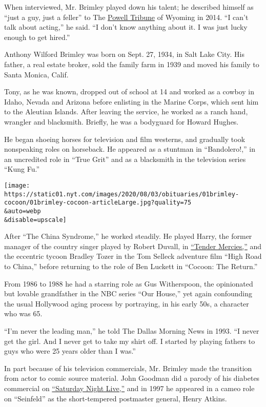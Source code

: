 When interviewed, Mr. Brimley played down his talent; he described
himself as ``just a guy, just a feller'' to The
\href{http://www.powelltribune.com/news/item/12188-\%E2\%80\%98just-a-feller\%E2\%80\%99-actor-wilford-brimley-reflects-on-long-career-stars-he\%E2\%80\%99s-known-and-the-music-he-loves-to-sing}{Powell
Tribune} of Wyoming in 2014. ``I can't talk about acting,'' he said. ``I
don't know anything about it. I was just lucky enough to get hired.''

Anthony Wilford Brimley was born on Sept. 27, 1934, in Salt Lake City.
His father, a real estate broker, sold the family farm in 1939 and moved
his family to Santa Monica, Calif.

Tony, as he was known, dropped out of school at 14 and worked as a
cowboy in Idaho, Nevada and Arizona before enlisting in the Marine
Corps, which sent him to the Aleutian Islands. After leaving the
service, he worked as a ranch hand, wrangler and blacksmith. Briefly, he
was a bodyguard for Howard Hughes.

He began shoeing horses for television and film westerns, and gradually
took nonspeaking roles on horseback. He appeared as a stuntman in
``Bandolero!,'' in an uncredited role in ``True Grit'' and as a
blacksmith in the television series ``Kung Fu.''

\texttt{[image: https://static01.nyt.com/images/2020/08/03/obituaries/01brimley-cocoon/01brimley-cocoon-articleLarge.jpg?quality=75\\\&auto=webp\\\&disable=upscale]}

After ``The China Syndrome,'' he worked steadily. He played Harry, the
former manager of the country singer played by Robert Duvall, in
\href{https://www.youtube.com/watch?v=d40BjDgpdwU}{``Tender Mercies,''}
and the eccentric tycoon Bradley Tozer in the Tom Selleck adventure film
``High Road to China,'' before returning to the role of Ben Luckett in
``Cocoon: The Return.''

From 1986 to 1988 he had a starring role as Gus Witherspoon, the
opinionated but lovable grandfather in the NBC series ``Our House,'' yet
again confounding the usual Hollywood aging process by portraying, in
his early 50s, a character who was 65.

``I'm never the leading man,'' he told The Dallas Morning News in 1993.
``I never get the girl. And I never get to take my shirt off. I started
by playing fathers to guys who were 25 years older than I was.''

In part because of his television commercials, Mr. Brimley made the
transition from actor to comic source material. John Goodman did a
parody of his diabetes commercial on
\href{https://video.yahoo.com/liberty-medical-000000755.html}{``Saturday
Night Live,''} and in 1997 he appeared in a cameo role on ``Seinfeld''
as the short-tempered postmaster general, Henry Atkins.

